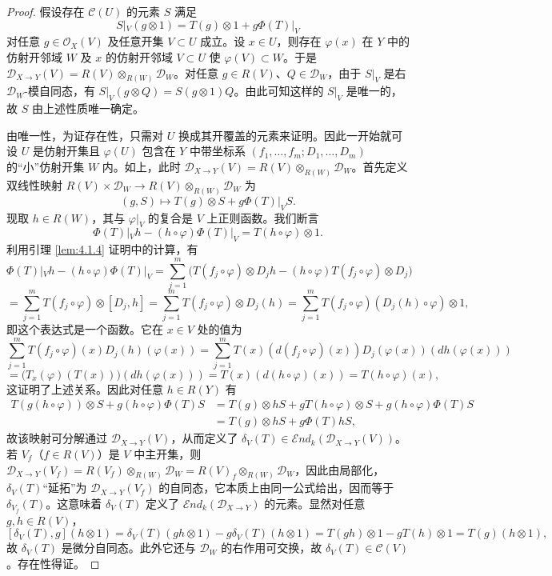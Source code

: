 \begin{proof}
假设存在 $\mathcal{C}(U)$ 的元素 $S$ 满足
$$S|_V(g\otimes 1)=T(g)\otimes 1+g\Phi(T)|_V$$
对任意 $g\in\mathcal{O}_X(V)$ 及任意开集 $V\subset U$ 成立。设 $x\in U$，则存在 $\varphi(x)$ 在 $Y$ 中的仿射开邻域 $W$ 及 $x$ 的仿射开邻域 $V\subset U$ 使 $\varphi(V)\subset W$。于是 $\mathcal{D}_{X\to Y}(V)=R(V)\otimes_{R(W)}\mathcal{D}_W$。对任意 $g\in R(V)$、$Q\in\mathcal{D}_W$，由于 $S|_V$ 是右 $\mathcal{D}_W$-模自同态，有 $S|_V(g\otimes Q)=S(g\otimes 1)Q$。由此可知这样的 $S|_V$ 是唯一的，故 $S$ 由上述性质唯一确定。

由唯一性，为证存在性，只需对 $U$ 换成其开覆盖的元素来证明。因此一开始就可设 $U$ 是仿射开集且 $\varphi(U)$ 包含在 $Y$ 中带坐标系 $(f_1,\dots,f_m;D_1,\dots,D_m)$ 的“小”仿射开集 $W$ 内。如上，此时 $\mathcal{D}_{X\to Y}(V)=R(V)\otimes_{R(W)}\mathcal{D}_W$。首先定义双线性映射 $R(V)\times\mathcal{D}_W\to R(V)\otimes_{R(W)}\mathcal{D}_W$ 为
$$(g,S)\longmapsto T(g)\otimes S+g\Phi(T)|_V S.$$
现取 $h\in R(W)$，其与 $\varphi|_V$ 的复合是 $V$ 上正则函数。我们断言
$$\Phi(T)|_V h-(h\circ\varphi)\Phi(T)|_V=T(h\circ\varphi)\otimes 1.$$
利用引理 \ref{lem:4.1.4} 证明中的计算，有
$$\Phi(T)|_V h-(h\circ\varphi)\Phi(T)|_V
=\sum_{j=1}^m\bigl(T(f_j\circ\varphi)\otimes D_jh-(h\circ\varphi)T(f_j\circ\varphi)\otimes D_j\bigr)$$
$$=\sum_{j=1}^m T(f_j\circ\varphi)\otimes[D_j,h]
=\sum_{j=1}^m T(f_j\circ\varphi)\otimes D_j(h)
=\sum_{j=1}^m T(f_j\circ\varphi)(D_j(h)\circ\varphi)\otimes 1,$$
即这个表达式是一个函数。它在 $x\in V$ 处的值为
$$\sum_{j=1}^m T(f_j\circ\varphi)(x)D_j(h)(\varphi(x))
=\sum_{j=1}^m T(x)(d(f_j\circ\varphi)(x))D_j(\varphi(x))(dh(\varphi(x)))$$
$$=\bigl(T_x(\varphi)(T(x))\bigr)(dh(\varphi(x)))=T(x)(d(h\circ\varphi)(x))=T(h\circ\varphi)(x),$$
这证明了上述关系。因此对任意 $h\in R(Y)$ 有
\begin{align*}
T(g(h\circ\varphi))\otimes S+g(h\circ\varphi)\Phi(T)S
&=T(g)\otimes hS+gT(h\circ\varphi)\otimes S+g(h\circ\varphi)\Phi(T)S\\
&=T(g)\otimes hS+g\Phi(T)hS,
\end{align*}
故该映射可分解通过 $\mathcal{D}_{X\to Y}(V)$，从而定义了 $\delta_V(T)\in\mathcal{E}nd_k(\mathcal{D}_{X\to Y}(V))$。若 $V_f$（$f\in R(V)$）是 $V$ 中主开集，则
$\mathcal{D}_{X\to Y}(V_f)=R(V_f)\otimes_{R(W)}\mathcal{D}_W=R(V)_f\otimes_{R(W)}\mathcal{D}_W$，因此由局部化，$\delta_V(T)$“延拓”为 $\mathcal{D}_{X\to Y}(V_f)$ 的自同态，它本质上由同一公式给出，因而等于 $\delta_{V_f}(T)$。这意味着 $\delta_V(T)$ 定义了 $\mathcal{E}nd_k(\mathcal{D}_{X\to Y})$ 的元素。显然对任意 $g,h\in R(V)$，
$$[\delta_V(T),g](h\otimes 1)=\delta_V(T)(gh\otimes 1)-g\delta_V(T)(h\otimes 1)
=T(gh)\otimes 1-gT(h)\otimes 1=T(g)(h\otimes 1),$$
故 $\delta_V(T)$ 是微分自同态。此外它还与 $\mathcal{D}_W$ 的右作用可交换，故 $\delta_V(T)\in\mathcal{C}(V)$。存在性得证。
\end{proof}


